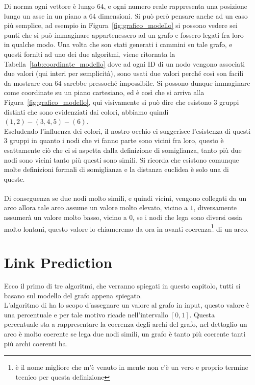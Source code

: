 Di norma ogni vettore è lungo $64$, e ogni numero reale rappresenta una posizione lungo un asse in un piano a $64$ dimensioni. Si può però pensare anche ad un caso più semplice, ad esempio in Figura~\ref{fig:grafico_modello} si possono vedere sei punti che si può immaginare appartenessero ad un grafo e fossero legati fra loro in qualche modo. Una volta che son stati generati i cammini su tale grafo, e questi forniti ad uno dei due algoritmi, viene ritornata la Tabella~\ref{tab:coordinate_modello} dove ad ogni ID di un nodo vengono associati due valori (qui interi per semplicità), sono usati due valori perché così son facili da mostrare con $64$ sarebbe pressoché impossibile. Si possono dunque immaginare come coordinate su un piano cartesiano, ed è così che si arriva alla Figura~\ref{fig:grafico_modello}, qui visivamente si può dire che esistono 3 gruppi distinti che sono evidenziati dai colori, abbiamo quindi $(1, 2) - (3, 4, 5) - (6)$.\\
Escludendo l'influenza dei colori, il nostro occhio ci suggerisce l'esistenza di questi 3 gruppi in quanto i nodi che vi fanno parte sono vicini fra loro, questo è esattamente ciò che ci si aspetta dalla definizione di somiglianza, tanto più due nodi sono vicini tanto più questi sono simili. Si ricorda che esistono comunque molte definizioni formali di somiglianza e la distanza euclidea è solo una di queste.\\
\\
Di conseguenza se due nodi molto simili, e quindi vicini, vengono collegati da un arco allora tale arco assume un valore molto elevato, vicino a $1$, diversamente assumerà un valore molto basso, vicino a $0$, se i nodi che lega sono diversi ossia molto lontani, questo valore lo chiameremo da ora in avanti coerenza\footnote{è il nome migliore che m'è venuto in mente non c'è un vero e proprio termine tecnico per questa definizione} di un arco.
%
\section{Link Prediction}
Ecco il primo di tre algoritmi, che verranno spiegati in questo capitolo, tutti si basano sul modello del grafo appena spiegato.\\
L'algoritmo di \LPred ha lo scopo d'assegnare un valore al grafo in input, questo valore è una percentuale e per tale motivo ricade nell'intervallo $[0, 1]$. Questa percentuale sta a rappresentare la coerenza degli archi del grafo, nel dettaglio un arco è molto coerente se lega due nodi simili, un grafo è tanto più coerente tanti più archi coerenti ha.
%
